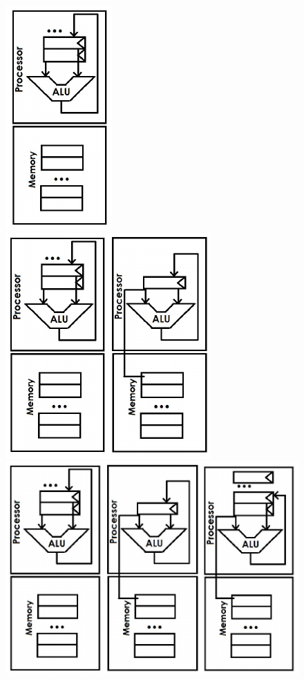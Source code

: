 \documentclass[9pt,twocolumn]{article}
\begin{document}
  \begin{figure}[h]
    \centering
    \includegraphics[scale=0.5]{./assets/001/stack.png}
    \includegraphics[scale=0.5]{./assets/001/accumulator.png}
    \includegraphics[scale=0.3]{./assets/001/register-memory.png}

\end{figure}
\end{document}
